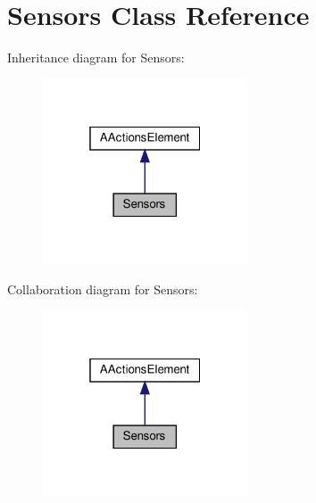 \hypertarget{classSensors}{}\section{Sensors Class Reference}
\label{classSensors}


Inheritance diagram for Sensors\+:
\nopagebreak
\begin{figure}[H]
\begin{center}
\leavevmode
\includegraphics[width=172pt]{classSensors__inherit__graph}
\end{center}
\end{figure}


Collaboration diagram for Sensors\+:
\nopagebreak
\begin{figure}[H]
\begin{center}
\leavevmode
\includegraphics[width=172pt]{classSensors__coll__graph}
\end{center}
\end{figure}
